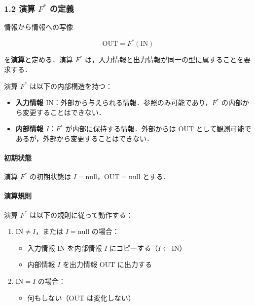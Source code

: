 \documentclass[a4paper,11pt]{ltjsarticle}
\providecommand{\tightlist}{\setlength{\itemsep}{0pt}\setlength{\parskip}{0pt}}
\begin{document}
\subsubsection{\texorpdfstring{1.2 演算 \(F^*\)
の定義}{1.2 演算 F\^{}* の定義}}\label{ux6f14ux7b97-f-ux306eux5b9aux7fa9}

情報から情報への写像

\[
\mathrm{OUT} = F^*(\mathrm{IN})
\]

を\textbf{演算}と定める．演算 \(F^*\)
は，入力情報と出力情報が同一の型に属することを要求する．

演算 \(F^*\) は以下の内部構造を持つ：

\begin{itemize}
\tightlist
\item
  \textbf{入力情報
  \(\mathrm{IN}\)}：外部から与えられる情報．参照のみ可能であり，\(F^*\)
  の内部から変更することはできない．
\item
  \textbf{内部情報 \(I\)}：\(F^*\) が内部に保持する情報．外部からは
  \(\mathrm{OUT}\)
  として観測可能であるが，外部から変更することはできない．
\end{itemize}

\paragraph{初期状態}\label{ux521dux671fux72b6ux614b}

演算 \(F^*\) の初期状態は
\(I = \mathrm{null}\)，\(\mathrm{OUT} = \mathrm{null}\) とする．

\paragraph{演算規則}\label{ux6f14ux7b97ux898fux5247}

演算 \(F^*\) は以下の規則に従って動作する：

\begin{enumerate}
\def\labelenumi{\arabic{enumi}.}
\tightlist
\item
  \(\mathrm{IN} \neq I\)，または \(I = \mathrm{null}\) の場合：

  \begin{itemize}
  \tightlist
  \item
    入力情報 \(\mathrm{IN}\) を内部情報 \(I\)
    にコピーする（\(I \leftarrow \mathrm{IN}\)）
  \item
    内部情報 \(I\) を出力情報 \(\mathrm{OUT}\) に出力する
  \end{itemize}
\item
  \(\mathrm{IN} = I\) の場合：

  \begin{itemize}
  \tightlist
  \item
    何もしない（\(\mathrm{OUT}\) は変化しない）
  \end{itemize}
\end{enumerate}
\end{document}
